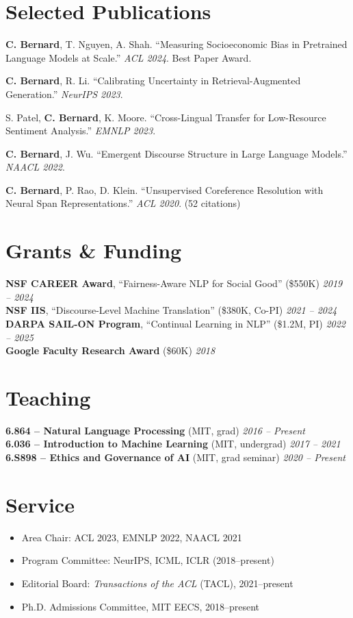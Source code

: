 \documentclass[11pt,a4paper]{article}
\begin{document}
\section{Selected Publications}
\begin{enumerate}[leftmargin=*, label={[\arabic*]}]
  \item \textbf{C. Bernard}, T. Nguyen, A. Shah. ``Measuring Socioeconomic Bias in Pretrained Language Models at Scale.'' \textit{ACL 2024}. Best Paper Award.
  \item \textbf{C. Bernard}, R. Li. ``Calibrating Uncertainty in Retrieval-Augmented Generation.'' \textit{NeurIPS 2023}.
  \item S. Patel, \textbf{C. Bernard}, K. Moore. ``Cross-Lingual Transfer for Low-Resource Sentiment Analysis.'' \textit{EMNLP 2023}.
  \item \textbf{C. Bernard}, J. Wu. ``Emergent Discourse Structure in Large Language Models.'' \textit{NAACL 2022}.
  \item \textbf{C. Bernard}, P. Rao, D. Klein. ``Unsupervised Coreference Resolution with Neural Span Representations.'' \textit{ACL 2020}. (52 citations)
\end{enumerate}

\section{Grants \& Funding}
\noindent\textbf{NSF CAREER Award}, ``Fairness-Aware NLP for Social Good'' (\$550K) \hfill \textit{2019 -- 2024}\\
\noindent\textbf{NSF IIS}, ``Discourse-Level Machine Translation'' (\$380K, Co-PI) \hfill \textit{2021 -- 2024}\\
\noindent\textbf{DARPA SAIL-ON Program}, ``Continual Learning in NLP'' (\$1.2M, PI) \hfill \textit{2022 -- 2025}\\
\noindent\textbf{Google Faculty Research Award} (\$60K) \hfill \textit{2018}

\section{Teaching}
\noindent\textbf{6.864 -- Natural Language Processing} (MIT, grad) \hfill \textit{2016 -- Present}\\
\noindent\textbf{6.036 -- Introduction to Machine Learning} (MIT, undergrad) \hfill \textit{2017 -- 2021}\\
\noindent\textbf{6.S898 -- Ethics and Governance of AI} (MIT, grad seminar) \hfill \textit{2020 -- Present}

\section{Service}
\begin{itemize}
  \item Area Chair: ACL 2023, EMNLP 2022, NAACL 2021
  \item Program Committee: NeurIPS, ICML, ICLR (2018--present)
  \item Editorial Board: \textit{Transactions of the ACL} (TACL), 2021--present
  \item Ph.D. Admissions Committee, MIT EECS, 2018--present
\end{itemize}
\end{document}
